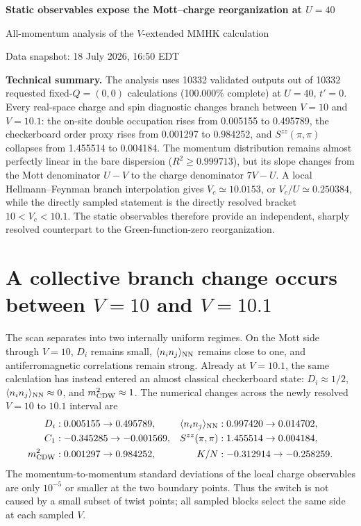 \documentclass[10pt]{article}
\begin{document}
\begin{center}
{\LARGE\bfseries Static observables expose the Mott--charge reorganization at $U=40$\par}
\vspace{0.35em}
{\large All-momentum analysis of the $V$-extended MMHK calculation\par}
\vspace{0.4em}
{\small Data snapshot: 18 July 2026, 16:50 EDT}
\end{center}

\vspace{0.5em}
\colorbox{softgray}{\parbox{0.965\linewidth}{
\textbf{Technical summary.}
The analysis uses 10332 validated outputs out of 10332 requested
fixed-$Q=(0,0)$ calculations (100.000\% complete) at $U=40$, $t'=0$.
Every real-space charge and spin diagnostic changes branch between $V=10$ and $V=10.1$:
the on-site double occupation rises from 0.005155 to 0.495789, the checkerboard
order proxy rises from 0.001297 to 0.984252, and
$S^{zz}(\pi,\pi)$ collapses from 1.455514 to 0.004184.
The momentum distribution remains almost perfectly linear in the bare dispersion
($R^2\ge 0.999713$), but its slope changes from the Mott denominator $U-V$ to the
charge denominator $7V-U$.  A local Hellmann--Feynman branch interpolation gives
$V_c\simeq 10.0153$, or $V_c/U\simeq 0.250384$, while the directly sampled statement
is the directly resolved bracket $10<V_c<10.1$.  The static observables therefore provide an
independent, sharply resolved counterpart to the Green-function-zero reorganization.}}

\section{A collective branch change occurs between $V=10$ and $V=10.1$}

The scan separates into two internally uniform regimes.  On the Mott side through
$V=10$, $D_i$ remains small, $\langle n_i n_j\rangle_{\rm NN}$ remains close to one,
and antiferromagnetic correlations remain strong.  Already at $V=10.1$, the same calculation
has instead entered an almost classical checkerboard state: $D_i\approx 1/2$,
$\langle n_i n_j\rangle_{\rm NN}\approx0$, and $m_{\rm CDW}^2\approx1$.
The numerical changes across the newly resolved $V=10$ to $10.1$ interval are
\begin{align*}
D_i &: 0.005155 \rightarrow 0.495789, &
\langle n_i n_j\rangle_{\rm NN} &: 0.997420 \rightarrow 0.014702,\\
C_1 &: -0.345285 \rightarrow -0.001569, &
S^{zz}(\pi,\pi) &: 1.455514 \rightarrow 0.004184,\\
m_{\rm CDW}^2 &: 0.001297 \rightarrow 0.984252, &
K/N &: -0.312914 \rightarrow -0.258259.
\end{align*}
The momentum-to-momentum standard deviations of the local charge observables are
only $10^{-5}$ or smaller at the two boundary points.  Thus the switch is not caused
by a small subset of twist points; all sampled blocks select the same side at each
sampled $V$.
\end{document}

